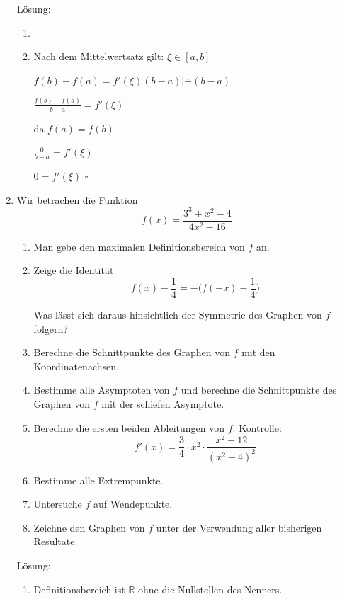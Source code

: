 \documentclass[main.tex]{subfiles}
\begin{document}
\begin{enumerate}
	      Lösung:
	      \begin{enumerate}
		      \item
		      \item Nach dem Mittelwertsatz gilt:
		            \( \xi \in [a,b] \)

		            \( f(b) - f(a) = f'(\xi )(b-a) | \div(b-a) \)

		            \( \frac{f(b) - f(a)}{b - a} = f'( \xi ) \)

		            da \( f(a) = f(b) \)

		            \( \frac{0}{b - a} = f'( \xi ) \)

		            \( 0 = f'( \xi ) \)  \( \square \)
	      \end{enumerate}
	\item Wir betrachen die Funktion
	      \[ f(x) = \frac{ 3^3 + x^2 - 4 }{
			      4x^2 - 16
		      } \]
	      \begin{enumerate}
		      \item Man gebe den maximalen Definitionsbereich von \( f \) an.
		      \item Zeige die Identität
		            \[ f(x) - \frac{1}{4} = - \Bigg( f(-x) - \frac{1}{4} \Bigg)  \]

		            Was lässt sich daraus hinsichtlich der Symmetrie des Graphen von
		            \( f \) folgern?
		      \item Berechne die Schnittpunkte des Graphen von \( f \)  mit den Koordinatenachsen.
		      \item Bestimme alle Asymptoten von \( f \) und berechne die Schnittpunkte des
		            Graphen von \( f \)  mit der schiefen Asymptote.
		      \item Berechne die ersten beiden Ableitungen von \( f \).
		            Kontrolle:
		            \[ f'(x) = \frac{3}{4} \cdot x^2 \cdot \frac{ x^2 - 12 }{ (x^2 - 4)^2 } \]
		      \item Bestimme alle Extrempunkte.
		      \item Untersuche \( f \) auf Wendepunkte.
		      \item Zeichne den Graphen von \( f \) unter der Verwendung aller bisherigen Resultate.
	      \end{enumerate}

	      Lösung:
	      \begin{enumerate}
		      \item Definitionsbereich ist \( \mathbb{R} \)  ohne die Nullstellen des Nenners.


\end{enumerate}
\end{enumerate}
\end{document}

